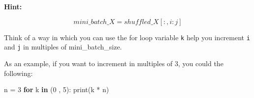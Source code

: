 \documentclass[11pt]{article}
\newenvironment{Shaded}{}{}
\newcommand{\KeywordTok}[1]{\textcolor[rgb]{0.00,0.44,0.13}{\textbf{{#1}}}}
\newcommand{\DecValTok}[1]{\textcolor[rgb]{0.25,0.63,0.44}{{#1}}}
\newcommand{\NormalTok}[1]{{#1}}
\newcommand{\ControlFlowTok}[1]{\textcolor[rgb]{0.00,0.44,0.13}{\textbf{{#1}}}}
\newcommand{\OperatorTok}[1]{\textcolor[rgb]{0.40,0.40,0.40}{{#1}}}
\newcommand{\BuiltInTok}[1]{{#1}}
\begin{document}
\textbf{Hint:}

\[mini\_batch\_X = shuffled\_X[:, i : j]\]

Think of a way in which you can use the for loop variable \texttt{k}
help you increment \texttt{i} and \texttt{j} in multiples of
mini\_batch\_size.

As an example, if you want to increment in multiples of 3, you could the
following:

\begin{Shaded}
\begin{Highlighting}[]
\NormalTok{n }\OperatorTok{=} \DecValTok{3}
\ControlFlowTok{for}\NormalTok{ k }\KeywordTok{in}\NormalTok{ (}\DecValTok{0}\NormalTok{ , }\DecValTok{5}\NormalTok{):}
    \BuiltInTok{print}\NormalTok{(k }\OperatorTok{*}\NormalTok{ n)}
\end{Highlighting}
\end{Shaded}
\end{document}
